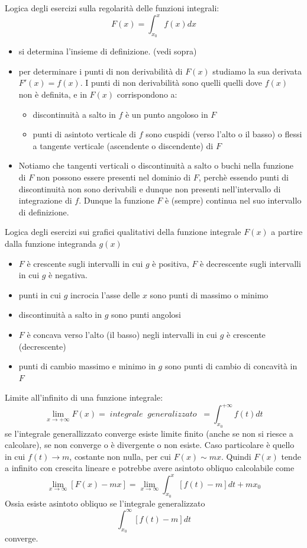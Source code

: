 \documentclass[a4paper, 9pt]{report}
\begin{document}
Logica degli esercizi sulla regolarità delle funzioni integrali:
\[
    F(x) = \int_{x_0}^{x} f(x)dx
\]
\begin{itemize}
    \item si determina l'insieme di definizione. (vedi sopra)
    \item per determinare i punti di non derivabilità di $F(x)$ studiamo la sua derivata $F'(x) = f(x)$. I punti di non derivabilità sono quelli quelli dove $f(x)$ non è definita, e in $F(x)$ corrispondono a:
    \begin{itemize}
        \item discontinuità a salto in $f$ è un punto angoloso in $F$
        \item punti di asintoto verticale di $f$ sono cuspidi (verso l'alto o il basso) o flessi a tangente verticale (ascendente o discendente) di $F$
    \end{itemize}
    \item Notiamo che tangenti verticali o discontinuità a salto o buchi nella funzione di $F$ non possono essere presenti nel dominio di $F$, perchè essendo punti di discontinuità non sono derivabili e dunque non presenti nell'intervallo di integrazione di $f$.\newline
    Dunque la funzione $F$ è (sempre) continua nel suo intervallo di definizione.
\end{itemize}
Logica degli esercizi sui grafici qualitativi della funzione integrale $F(x)$ a partire dalla funzione integranda $g(x)$
\begin{itemize}
    \item $F$ è crescente sugli intervalli in cui $g$ è positiva, $F$ è decrescente sugli intervalli in cui $g$ è negativa.
    \item punti in cui $g$ incrocia l'asse delle $x$ sono punti di massimo o minimo
    \item discontinuità a salto in $g$ sono punti angolosi
    \item $F$ è concava verso l'alto (il basso) negli intervalli in cui $g$ è crescente (decrescente)
    \item punti di cambio massimo e minimo in $g$ sono punti di cambio di concavità in $F$
\end{itemize}
Limite all'infinito di una funzione integrale:
\[
    \lim_{x\rightarrow +\infty}F(x) = \; integrale \;\;generalizzato \;\;= \int_{x_0}^{+\infty}f(t)dt
\]
se l'integrale generallizzato converge esiste limite finito (anche se non si riesce a calcolare), se non converge o è divergente o non esiste.\newline
Caso particolare è quello in cui $f(t) \rightarrow m$, costante non nulla, per cui $F(x) \sim  mx$. Quindi $F(x)$ tende a infinito con crescita lineare e potrebbe avere asintoto obliquo calcolabile come 
\[
    \lim_{x\rightarrow \infty}[F(x)-mx] = \lim_{x\rightarrow \infty}\int_{x_0}^{x}[f(t)-m]dt + mx_0
\]
Ossia esiste asintoto obliquo se l'integrale generalizzato
\[
    \int_{x_0}^{\infty}[f(t)-m]dt
\]
converge.
\newpage
\end{document}
